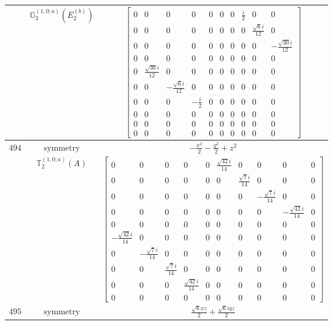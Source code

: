 \documentclass[fleqn,8pt,landscape]{jsarticle}
\begin{document}
\begin{longtable}{ccc}
$  $ & $ \mathbb{G}_{3}^{(1,0;a)}(E_{2}^{(b)}) $ & $ \begin{bmatrix} 0 & 0 & 0 & 0 & 0 & 0 & 0 & \frac{i}{2} & 0 & 0 \\ 0 & 0 & 0 & 0 & 0 & 0 & 0 & 0 & \frac{\sqrt{6} i}{12} & 0 \\ 0 & 0 & 0 & 0 & 0 & 0 & 0 & 0 & 0 & - \frac{\sqrt{30} i}{12} \\ 0 & 0 & 0 & 0 & 0 & 0 & 0 & 0 & 0 & 0 \\ 0 & \frac{\sqrt{30} i}{12} & 0 & 0 & 0 & 0 & 0 & 0 & 0 & 0 \\ 0 & 0 & - \frac{\sqrt{6} i}{12} & 0 & 0 & 0 & 0 & 0 & 0 & 0 \\ 0 & 0 & 0 & - \frac{i}{2} & 0 & 0 & 0 & 0 & 0 & 0 \\ 0 & 0 & 0 & 0 & 0 & 0 & 0 & 0 & 0 & 0 \\ 0 & 0 & 0 & 0 & 0 & 0 & 0 & 0 & 0 & 0 \\ 0 & 0 & 0 & 0 & 0 & 0 & 0 & 0 & 0 & 0 \end{bmatrix} $ \\ \hline
$ 494 $ & $ \text{symmetry} $ & $ - \frac{x^{2}}{2} - \frac{y^{2}}{2} + z^{2} $ \\
$  $ & $ \mathbb{T}_{2}^{(1,0;a)}(A) $ & $ \begin{bmatrix} 0 & 0 & 0 & 0 & 0 & \frac{\sqrt{42} i}{14} & 0 & 0 & 0 & 0 \\ 0 & 0 & 0 & 0 & 0 & 0 & \frac{\sqrt{7} i}{14} & 0 & 0 & 0 \\ 0 & 0 & 0 & 0 & 0 & 0 & 0 & - \frac{\sqrt{7} i}{14} & 0 & 0 \\ 0 & 0 & 0 & 0 & 0 & 0 & 0 & 0 & - \frac{\sqrt{42} i}{14} & 0 \\ 0 & 0 & 0 & 0 & 0 & 0 & 0 & 0 & 0 & 0 \\ - \frac{\sqrt{42} i}{14} & 0 & 0 & 0 & 0 & 0 & 0 & 0 & 0 & 0 \\ 0 & - \frac{\sqrt{7} i}{14} & 0 & 0 & 0 & 0 & 0 & 0 & 0 & 0 \\ 0 & 0 & \frac{\sqrt{7} i}{14} & 0 & 0 & 0 & 0 & 0 & 0 & 0 \\ 0 & 0 & 0 & \frac{\sqrt{42} i}{14} & 0 & 0 & 0 & 0 & 0 & 0 \\ 0 & 0 & 0 & 0 & 0 & 0 & 0 & 0 & 0 & 0 \end{bmatrix} $ \\ \hline
$ 495 $ & $ \text{symmetry} $ & $ \frac{\sqrt{6} x z}{2} + \frac{\sqrt{6} i y z}{2} $ \\

\end{longtable}
\end{document}
